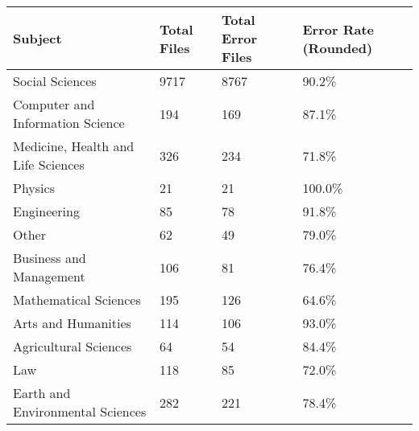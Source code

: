 \begin{tabular}{llll}
\toprule
                           Subject & Total Files & Total Error Files & Error Rate (Rounded) \\
\midrule
                   Social Sciences &        9717 &              8767 &                90.2\% \\ \hline
  Computer and Information Science &         194 &               169 &                87.1\% \\ \hline
Medicine, Health and Life Sciences &         326 &               234 &                71.8\% \\ \hline
                           Physics &          21 &                21 &               100.0\% \\ \hline
                       Engineering &          85 &                78 &                91.8\% \\ \hline
                             Other &          62 &                49 &                79.0\% \\ \hline
           Business and Management &         106 &                81 &                76.4\% \\ \hline
             Mathematical Sciences &         195 &               126 &                64.6\% \\ \hline
               Arts and Humanities &         114 &               106 &                93.0\% \\ \hline
             Agricultural Sciences &          64 &                54 &                84.4\% \\ \hline
                               Law &         118 &                85 &                72.0\% \\ \hline
  Earth and Environmental Sciences &         282 &               221 &                78.4\% \\
\bottomrule
\end{tabular}

